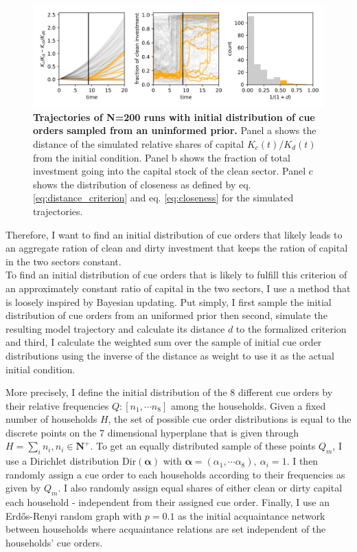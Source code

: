 \begin{figure}[t]
  \centering
  \includegraphics[width= \textwidth]{figures/initial_condition_sampling.png}
  \caption[Trajectories of N=200 runs with initial conditions for cue orders sampled from an uninformed prior]{\textbf{Trajectories of N=200 runs with initial distribution of cue orders sampled from an uninformed prior.} Panel a shows the distance of the simulated relative shares of capital $K_c(t)/K_d(t)$ from the initial condition. Panel b shows the fraction of total investment going into the capital stock of the clean sector. Panel c shows the distribution of closeness as defined by eq. \ref{eq:distance_criterion} and eq. \ref{eq:closeness} for the simulated trajectories.}
  \label{fig:initial_conditions_sampled}
\end{figure}
Therefore, I want to find an initial distribution of cue orders that likely leads to an aggregate ration of clean and dirty investment that keeps the ration of capital in the two sectors constant.\\

To find an initial distribution of cue orders that is likely to fulfill this criterion of an approximately constant ratio of capital in the two sectors, I use a method that is loosely inspired by Bayesian updating. Put simply, I first sample the initial distribution of cue orders from an uniformed prior then second, simulate the resulting model trajectory and calculate its distance $d$ to the formalized criterion and third, I calculate the weighted sum over the sample of initial cue order distributions using the inverse of the distance as weight to use it as the actual initial condition.



More precisely, I define the initial distribution of the 8 different cue orders by their relative frequencies $Q: [n_1, \cdots n_8]$ among the households. Given a fixed number of households $H$, the set of possible cue order distributions is equal to the discrete points on the 7 dimensional hyperplane that is given through $H = \sum_i n_i, n_i \in \mathbf{N^{+}}$. To get an equally distributed sample of these points $Q_m$, I use a Dirichlet distribution $\mathrm{Dir}(\mathbf{\alpha})$ with $\mathbf{\alpha}=(\alpha_1, \cdots \alpha_8), ~ \alpha_i=1$. I then randomly assign a cue order to each households according to their frequencies as given by $Q_m$. I also randomly assign equal shares of either clean or dirty capital each household - independent from their assigned cue order. Finally, I use an Erd\H{o}s-Renyi random graph with $p=0.1$ as the initial acquaintance network between households where acquaintance relations are set independent of the households' cue orders.


